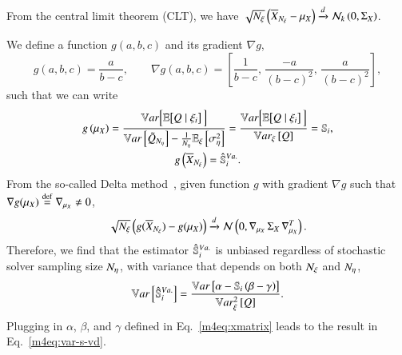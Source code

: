 From the central limit theorem (CLT), we have $\sqrt{{N_\xi}} \left( \overline{X}_{{N_\xi}} - \mu_X \right) \xrightarrow{d} \mathcal{N}_k \left(0, \Sigma_X \right)$. 

\noindent
We define a function $g(a,b,c)$ and its gradient $\nabla g$,
\begin{equation}
    g (a,b,c) = \frac{a}{b - c} , \qquad
    \nabla g (a,b,c) = \left[ \frac{1}{b-c}, \, \frac{-a}{(b-c)^2}, \, \frac{a}{(b-c)^2} \right] ,
\end{equation}
such that we can write 
\begin{gather}
    g \left( \mu_X \right) = \frac{\mathbb{V}ar\Bigl[ \mathbb{E}\bigl[Q\mid\xi_i\bigr] \, {} \Bigr]}{\mathbb{V}ar\left[\tilde{Q}_{{N_\eta}}\right] - \frac{1}{{N_\eta}}\mathbb{E}_\xi\left[\sigma^2_\eta\right]} = \frac{\mathbb{V}ar\Bigl[ \mathbb{E}\bigl[Q\mid\xi_{i}\bigr] \, {} \Bigr]}{\mathbb{V}ar_{\xi}\left[Q\right]} = \mathbb{S}_{i} ,\\
    g \left( \overline{X}_{{N_\xi}} \right) = \hat{\mathbb{S}}_{i}^{Va.} .
\end{gather}
From the so-called Delta method~\cite{vandervaart-2000}, given function $g$ with gradient $\nabla g$ such that $\nabla g (\mu_X) \overset{\operatorname{def}}{=} \nabla_{\mu_X} \neq 0$, 
\begin{equation*}
    \sqrt{{N_\xi}} \left( g(\overline{X}_{{N_\xi}}) - g(\mu_X) \right) \xrightarrow{d} \mathcal{N} \left( 0, \nabla_{\mu_X} \, \Sigma_X \, \nabla_{\mu_X}^T \right) .
\end{equation*}
%
Therefore, we find that the estimator $\hat{\mathbb{S}}_{i}^{Va.}$ is unbiased regardless of stochastic solver sampling size ${N_\eta}$, with variance that depends on both ${N_\xi}$ and ${N_\eta}$,
\begin{equation}
    \mathbb{V}ar\left[\hat{\mathbb{S}}_{i}^{Va.}\right] = \frac{\mathbb{V}ar\left[\alpha - \mathbb{S}_{i} \left( \beta - \gamma \right)\right]}{\mathbb{V}ar^2_{\xi}\left[Q\right]} .
\end{equation}
Plugging in $\alpha$, $\beta$, and $\gamma$ defined in Eq.~\eqref{m4eq:xmatrix} leads to the result in Eq.~\ref{m4eq:var-s-vd}.

